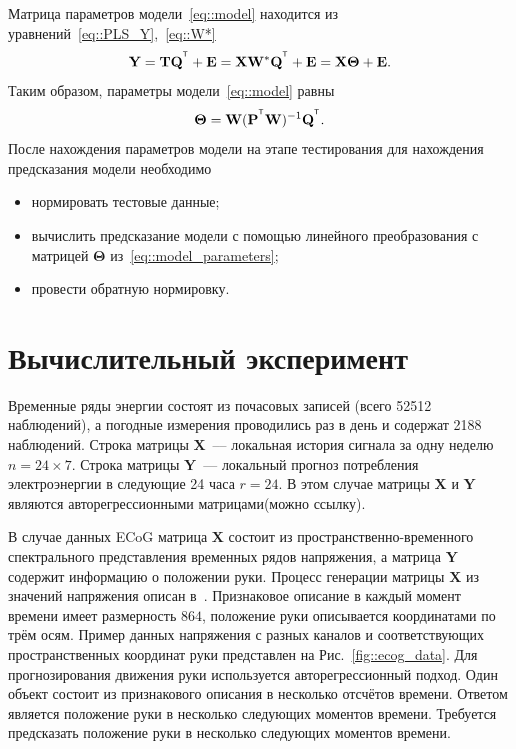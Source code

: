 \documentclass[12pt,twoside]{article}
\newcommand{\bY}{\mathbf{Y}}
\newcommand{\bX}{\mathbf{X}}
\newcommand{\bP}{\mathbf{P}}
\newcommand{\bT}{\mathbf{T}}
\newcommand{\bQ}{\mathbf{Q}}
\newcommand{\bE}{\mathbf{E}}
\newcommand{\bW}{\mathbf{W}}
\newcommand{\bTheta}{\boldsymbol{\Theta}}
\newcommand{\T}{^{\text{\tiny\sffamily\upshape\mdseries T}}}
\begin{document}
Матрица параметров модели~\ref{eq::model} находится из уравнений~\eqref{eq::PLS_Y},~\eqref{eq::W*}
\begin{equation*}
    \bY = \bT \bQ^{\T} + \bE = \bX \bW^* \bQ^{\T} + \bE = \bX \bTheta + \bE.
\end{equation*}
Таким образом, параметры модели~\eqref{eq::model} равны
\begin{equation}
    \bTheta = \bW (\bP^{\T} \bW)^{-1} \bQ^{\T}.
    \label{eq::model_parameters}
\end{equation}
После нахождения параметров модели на этапе тестирования для нахождения предсказания модели необходимо
\begin{itemize}
	\item нормировать тестовые данные;	
	\item вычислить предсказание модели с помощью линейного преобразования с матрицей $\bTheta$ из~\eqref{eq::model_parameters};
	\item провести обратную нормировку.
\end{itemize}

\section{Вычислительный эксперимент}
Временные ряды энергии состоят из почасовых записей (всего 52512 наблюдений), а погодные измерения проводились раз в день и содержат 2188 наблюдений. 
Строка матрицы $\bX$~--– локальная история сигнала за одну неделю $n = 24 \times 7$. Строка матрицы $\bY$~--- локальный прогноз потребления электроэнергии в следующие 24 часа $r = 24$. В этом случае матрицы $\bX$ и $\bY$ являются авторегрессионными матрицами(можно ссылку).

В случае данных ECoG матрица $\bX$ состоит из пространственно-временного спектрального представления временных рядов напряжения, а матрица $\bY$ содержит информацию о положении руки. 
Процесс генерации матрицы $\bX$ из значений напряжения описан в~\cite{gasanov2017pls}. 
Признаковое описание в каждый момент времени имеет размерность $864$, положение руки описывается координатами по трём осям. 
Пример данных напряжения с разных каналов и соответствующих пространственных координат руки представлен на Рис.~\ref{fig::ecog_data}.
Для прогнозирования движения руки используется авторегрессионный подход.
Один объект состоит из признакового описания в несколько отсчётов времени. 
Ответом является положение руки в несколько следующих моментов времени.
Требуется предсказать положение руки в несколько следующих моментов времени.
\end{document}
